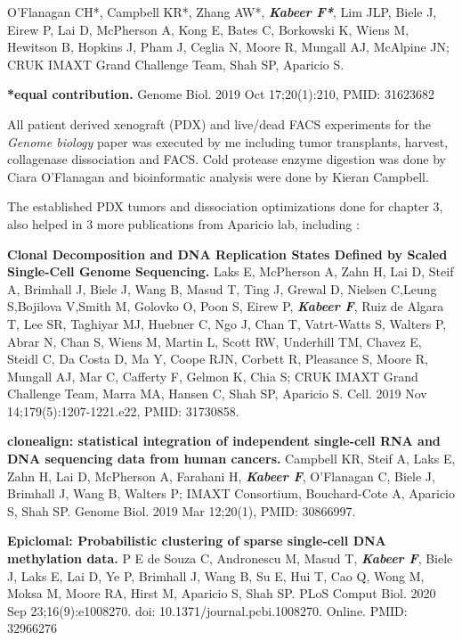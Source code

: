 O'Flanagan CH*, Campbell KR*, Zhang AW*, \emph{\textbf{Kabeer F*}}, Lim JLP, Biele J, Eirew P, Lai D, McPherson A, Kong E,
Bates C, Borkowski K, Wiens M, Hewitson B, Hopkins J, Pham J, 
Ceglia N, Moore R, Mungall AJ,
McAlpine JN; CRUK IMAXT Grand Challenge Team, Shah SP, Aparicio S.

\textbf{*equal contribution.} Genome Biol. 2019 Oct 17;20(1):210, PMID: 31623682 

All patient derived xenograft (PDX)  and live/dead \ac{FACS} experiments for the \textit{Genome biology} paper was executed by me including tumor transplants, harvest, collagenase dissociation and FACS. Cold protease enzyme digestion was done by Ciara O'Flanagan and bioinformatic analysis were done by Kieran Campbell.

The established PDX tumors and dissociation optimizations done for chapter 3, also helped in 3 more publications from Aparicio lab, including \cite{laks2019clonal, campbell2019clonealign, de2020epiclomal}:
     
\textbf{Clonal Decomposition and DNA Replication States Defined by Scaled Single-Cell Genome Sequencing.}
Laks E, McPherson A, Zahn H, Lai D, Steif A, Brimhall J, Biele J, Wang B, Masud T, Ting J, Grewal D, Nielsen C,Leung S,Bojilova V,Smith M, Golovko O, Poon S, Eirew P, \emph{\textbf{Kabeer F}}, Ruiz de Algara T, Lee SR, Taghiyar MJ, Huebner C, Ngo J, Chan T, Vatrt-Watts S, Walters P, Abrar N, Chan S, Wiens M, Martin L, Scott RW, Underhill TM, Chavez E, Steidl C, Da Costa D, Ma Y, Coope RJN, Corbett R, Pleasance S, Moore R, Mungall AJ, Mar C, Cafferty F, Gelmon K, Chia S; CRUK IMAXT Grand Challenge Team, Marra MA, Hansen C, Shah SP, Aparicio S. Cell. 2019 Nov 14;179(5):1207-1221.e22,  PMID: 31730858.


\textbf{clonealign: statistical integration of independent single-cell RNA and DNA sequencing data from human cancers.}
Campbell KR, Steif A, Laks E, Zahn H, Lai D, McPherson A, Farahani H, \emph{\textbf{Kabeer F}}, O'Flanagan  C, Biele J, Brimhall J, Wang B, Walters P; IMAXT Consortium, Bouchard-Cote A, Aparicio S, Shah SP. Genome Biol. 2019 Mar 12;20(1), PMID: 30866997. 

\textbf{Epiclomal: Probabilistic clustering of sparse single-cell DNA methylation data.}
P E de Souza C, Andronescu M, Masud T, \emph{\textbf{Kabeer F}}, Biele J, Laks E, Lai D, Ye P, Brimhall J, Wang B, Su E, Hui T, Cao Q, Wong M, Moksa M, Moore RA, Hirst M, Aparicio S, Shah SP. PLoS Comput Biol. 2020 Sep 23;16(9):e1008270. doi: 10.1371/journal.pcbi.1008270. Online. PMID: 32966276

